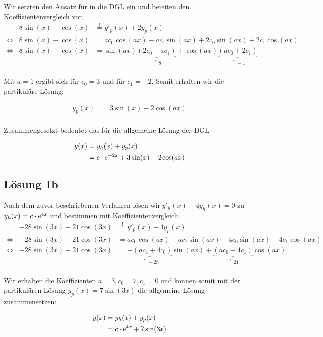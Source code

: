 \documentclass[main.tex]{subfiles}
\begin{document}
Wir setzten den Ansatz für in die DGL ein und bereiten den Koeffizientenvergleich vor.
\begin{equation*}
\begin{array}{rrl}
                & 8\sin(x) - \cos(x) &\overset{!}{=} y'_p(x) + 2y_p(x) \\
\Leftrightarrow & 8\sin(x) - \cos(x) &= ac_0 \cos (ax) - ac_1\sin(ax) +  2c_0 \sin(ax) + 2c_1\cos(ax) \\
\Leftrightarrow & 8\sin(x) - \cos(x) &= \sin(ax)\underbrace{(2c_0 - ac_1)}_{\overset{!}{=}8} + \cos (ax)\underbrace{(ac_0 + 2c_1)}_{\overset{!}{=}-1}\\
\end{array}
\end{equation*}

Mit $a=1$ ergibt sich für $c_0 = 3$ und für $c_1 = -2$. Somit erhalten wir die partikuläre Lösung:

\begin{align*}
    y_p(x)  &= 3\sin (x) -2 \cos(ax) \\
\end{align*}

Zusammengesetzt bedeutet das für die allgemeine Lösung der DGL

\begin{align*}
    y(x) &= y_h(x) + y_p(x) \\
         &= c \cdot \mathrm{e}^{-2x} + 3\sin (x) -2 \cos(ax) \\
\end{align*}

\subsection{Lösung 1b}
Nach dem zuvor beschriebenen Verfahren lösen wir $y'_h(x) - 4y_h(x) = 0$ zu $y_h(x) = c\cdot \mathrm{e}^{4x}$ 
und bestimmen mit Koeffizientenvergleich:
\begin{equation*}
    \begin{array}{rrl}
                    & -28\sin(3x) + 21\cos(3x) &\overset{!}{=} y'_p(x) - 4y_p(x) \\
    \Leftrightarrow & -28\sin(3x) + 21\cos(3x) &= ac_0 \cos (ax) - ac_1\sin(ax) - 4c_0 \sin (ax) -4c_1\cos(ax) \\
    \Leftrightarrow & -28\sin(3x) + 21\cos(3x) &= \underbrace{-(ac_1 + 4c_0)}_{\overset{!}{=}-28}\sin(ax) + \underbrace{(ac_0  -4c_1)}_{\overset{!}{=}21}\cos(ax) \\
    \end{array}
\end{equation*}

Wir erhalten die Koeffizienten $a=3, c_0=7, c_1=0$ und können somit mit der partikulären Lösung $y_p(x)=7\sin(3x)$ die allgemeine Lösung zusammensetzen:

\begin{align*}
    y(x) &= y_h(x) + y_p(x) \\
         &= c\cdot \mathrm{e}^{4x} + 7\sin(3x)
\end{align*}
\end{document}
